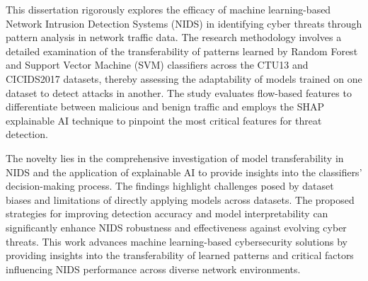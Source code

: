 This dissertation rigorously explores the efficacy of machine learning-based Network Intrusion Detection Systems (NIDS) in identifying cyber threats through pattern analysis in network traffic data. The research methodology involves a detailed examination of the transferability of patterns learned by Random Forest and Support Vector Machine (SVM) classifiers across the CTU13 and CICIDS2017 datasets, thereby assessing the adaptability of models trained on one dataset to detect attacks in another. The study evaluates flow-based features to differentiate between malicious and benign traffic and employs the SHAP explainable AI technique to pinpoint the most critical features for threat detection.

\noindent The novelty lies in the comprehensive investigation of model transferability in NIDS and the application of explainable AI to provide insights into the classifiers' decision-making process. The findings highlight challenges posed by dataset biases and limitations of directly applying models across datasets. The proposed strategies for improving detection accuracy and model interpretability can significantly enhance NIDS robustness and effectiveness against evolving cyber threats. This work advances machine learning-based cybersecurity solutions by providing insights into the transferability of learned patterns and critical factors influencing NIDS performance across diverse network environments.